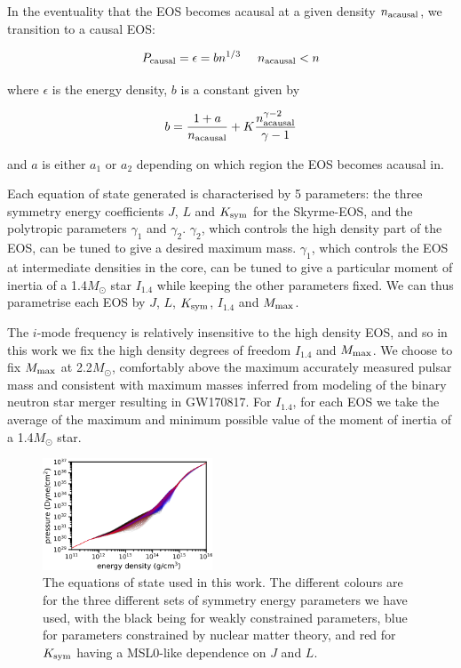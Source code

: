 \documentclass[fleqn,usenatbib]{mnras}
\begin{document}
In the eventuality that the EOS becomes acausal at a given density $n_{\rm acausal}$, we transition to a causal EOS:

\begin{equation}
P_{\rm causal} = \epsilon = bn^{1/3} \;\;\;\;\;  n_{\rm acausal} < n
\end{equation}

\noindent where $\epsilon$ is the energy density, $b$ is a constant given by

\begin{equation} 
b = \frac{1+a}{n_{\rm acausal}} + K \frac{n_{\rm acausal}^{\gamma-2}}{\gamma-1}
\end{equation}

\noindent and $a$ is either $a_1$ or $a_2$ depending on which region the EOS becomes acausal in.

Each equation of state generated is characterised by 5 parameters: the three symmetry energy coefficients $J$, $L$ and $K_{\rm sym}$ for the Skyrme-EOS, and the polytropic parameters $\gamma_1$ and $\gamma_2$. $\gamma_2$, which controls the high density part of the EOS, can be tuned to give a desired maximum mass. $\gamma_1$, which controls the EOS at intermediate densities in the core, can be tuned to give a particular moment of inertia of a 1.4$M_{\odot}$ star $I_{1.4}$ while keeping the other parameters fixed. We can thus parametrise each EOS by $J$, $L$, $K_{\rm sym}$, $I_{1.4}$ and $M_{\rm max}$.

The $i$-mode frequency is relatively insensitive to the high density EOS, and so in this work we fix the high density degrees of freedom $I_{1.4}$ and $M_{\rm max}$. We choose to fix $M_{\rm max}$ at 2.2$M_{\odot}$, comfortably above the maximum accurately measured pulsar mass \citep{cromartie2020relativistic} and consistent with maximum masses inferred from modeling of the binary neutron star merger resulting in GW170817. For $I_{1.4}$, for each EOS we take the average of the maximum and minimum possible value of the moment of inertia of a 1.4$M_{\odot}$ star.



\begin{figure}
\centering
\includegraphics[width=0.45\textwidth,angle=0]{EoSs_lines.png}
\caption{The equations of state used in this work. The different colours are for the three different sets of symmetry energy parameters we have used, with the black being for weakly constrained parameters, blue for parameters constrained by nuclear matter theory, and red for $K_{\rm sym}$ having a MSL0-like dependence on $J$ and $L$.}
\label{fig:EoSs}
\end{figure}
\end{document}
